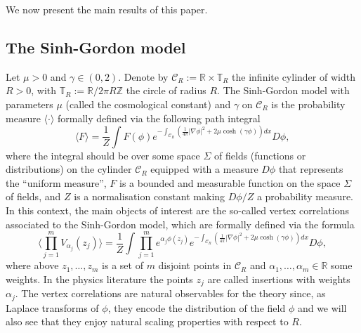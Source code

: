 \documentclass[11pt]{amsart}
\numberwithin{equation}{section}
\theoremstyle{definition}
\newcommand{\R}{\mathbb{R}}
\newcommand{\Z}{\mathbb{Z}}
\newcommand{\cjd}{\rangle}
\newcommand{\cjg}{\langle}
\newcommand{\mc}{\mathcal}
\def\T{\mathbb{T}}
\begin{document}
We now present the main results of this paper.





\subsection{The Sinh-Gordon model}

Let $\mu > 0$ and $\gamma \in (0,2)$. Denote by $\mc{C}_R := \R \times \T_R$ the infinite cylinder of width $R>0$, with $\T_R:=\R/2\pi R\Z$ the circle of radius $R$. 
The Sinh-Gordon model with parameters $\mu$ (called the cosmological constant) and $\gamma$ on $\mc{C}_R$ is the probability measure $\langle \cdot \rangle$ formally defined via the following path integral
\begin{equation} \label{eq: formal def sinh}
\langle F \rangle=
\frac{1}{Z} \int F(\phi) e^{- \int_{\mc{C}_R}(\frac 1{4\pi} |\nabla \phi|^2 + 2\mu \cosh(\gamma \phi)) dx} D\phi,
\end{equation}
where the integral should be over some space $\Sigma$ of fields (functions or distributions) on the cylinder $\mc{C}_R$ equipped with a measure $D\phi$ that represents the ``uniform measure'',
 $F$ is a bounded and measurable function on the space $\Sigma$ of fields, and $Z$ is a normalisation constant making $D\phi/Z$ a probability measure.
In this context, the main objects of interest are the so-called vertex correlations associated to the Sinh-Gordon model, which are formally defined via the formula
\begin{equation}\label{correlationsintro}
\cjg \prod_{j=1}^m V_{\alpha_j}(z_j)\cjd
=	
\frac{1}{Z} \int \prod_{j=1}^m e^{\alpha_j \phi(z_j)} e^{- \int_{\mc{C}_R} ( \frac 1{4\pi} |\nabla \phi|^2 +2\mu \cosh(\gamma \phi) ) dx} D\phi,
\end{equation}
where above $z_1,\dots,z_m$ is a set of $m$ disjoint points in $\mc{C}_R$ and $\alpha_1,\dots,\alpha_m\in \R$ some weights. In the physics literature the points $z_j$ are called 
insertions with weights $\alpha_j$. The vertex correlations are natural observables for the theory since, as Laplace transforms of $\phi$, they encode the distribution of the field $\phi$ and we will also see that they enjoy natural scaling properties with respect to $R$. 
\end{document}

